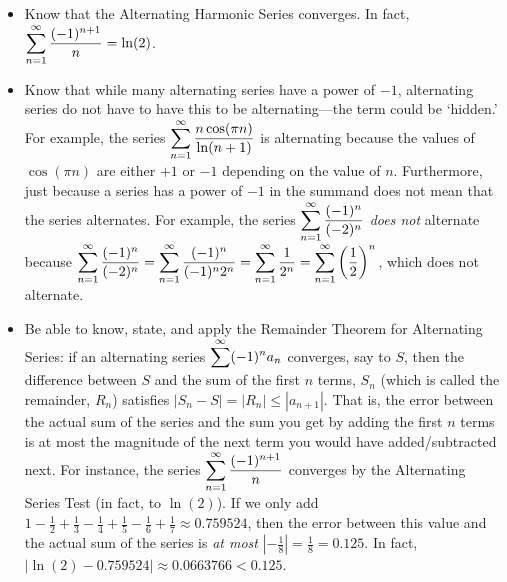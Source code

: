 \documentclass[11pt,letterpaper]{article}
\begin{document}
\begin{itemize}
\item Know that the Alternating Harmonic Series converges. In fact, $\displaystyle\sum_{n=1}^\infty \dfrac{(-1)^{n+1}}{n}= \ln(2)$.

\item Know that while many alternating series have a power of $-1$, alternating series do not have to have this to be alternating---the term could be `hidden.' For example, the series $\displaystyle\sum_{n=1}^\infty \dfrac{n \cos(\pi n)}{\ln(n + 1)}$ is alternating because the values of $\cos(\pi n)$ are either $+1$ or $-1$ depending on the value of $n$. Furthermore, just because a series has a power of $-1$ in the summand does not mean that the series alternates. For example, the series $\displaystyle\sum_{n=1}^\infty \dfrac{(-1)^n}{(-2)^n}$ \textit{does not} alternate because $\displaystyle\sum_{n=1}^\infty \dfrac{(-1)^n}{(-2)^n}= \sum_{n=1}^\infty \dfrac{(-1)^n}{(-1)^n 2^n}= \sum_{n=1}^\infty \dfrac{1}{2^n}= \sum_{n=1}^\infty \left( \dfrac{1}{2} \right)^n$, which does not alternate. 

\item Be able to know, state, and apply the Remainder Theorem for Alternating Series: if an alternating series $\displaystyle\sum^\infty (-1)^n a_n$ converges, say to $S$, then the difference between $S$ and the sum of the first $n$ terms, $S_n$ (which is called the remainder, $R_n$) satisfies $|S_n - S|= |R_n| \leq |a_{n+1}|$. That is, the error between the actual sum of the series and the sum you get by adding the first $n$ terms is at most the magnitude of the next term you would have added/subtracted next. For instance, the series $\displaystyle\sum_{n=1}^\infty \dfrac{(-1)^{n+1}}{n}$ converges by the Alternating Series Test (in fact, to $\ln(2)$). If we only add $1 - \frac{1}{2} + \frac{1}{3} - \frac{1}{4} + \frac{1}{5} - \frac{1}{6} + \frac{1}{7} \approx 0.759524$, then the error between this value and the actual sum of the series is \textit{at most} $\left| -\frac{1}{8} \right|= \frac{1}{8}= 0.125$. In fact, $|\ln(2) - 0.759524| \approx 0.0663766 < 0.125$.


\end{itemize}
\end{document}
